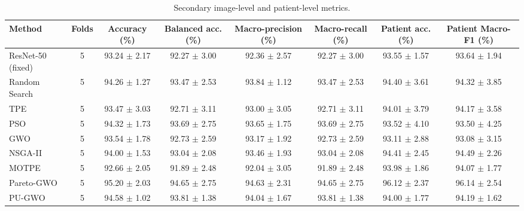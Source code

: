 \begin{table}[t]
\centering
\caption{Secondary image-level and patient-level metrics.}
\label{tab:table4_secondary_metrics}
\small
\begin{tabular}{lccccccc}
\toprule
Method & Folds & Accuracy (\%) & Balanced acc. (\%) & Macro-precision (\%) & Macro-recall (\%) & Patient acc. (\%) & Patient Macro-F1 (\%) \\
\midrule
ResNet-50 (fixed) & 5 & 93.24 $\pm$ 2.17 & 92.27 $\pm$ 3.00 & 92.36 $\pm$ 2.57 & 92.27 $\pm$ 3.00 & 93.55 $\pm$ 1.57 & 93.64 $\pm$ 1.94 \\
Random Search & 5 & 94.26 $\pm$ 1.27 & 93.47 $\pm$ 2.53 & 93.84 $\pm$ 1.12 & 93.47 $\pm$ 2.53 & 94.40 $\pm$ 3.61 & 94.32 $\pm$ 3.85 \\
TPE & 5 & 93.47 $\pm$ 3.03 & 92.71 $\pm$ 3.11 & 93.00 $\pm$ 3.05 & 92.71 $\pm$ 3.11 & 94.01 $\pm$ 3.79 & 94.17 $\pm$ 3.58 \\
PSO & 5 & 94.32 $\pm$ 1.73 & 93.69 $\pm$ 2.75 & 93.65 $\pm$ 1.75 & 93.69 $\pm$ 2.75 & 93.52 $\pm$ 4.10 & 93.50 $\pm$ 4.25 \\
GWO & 5 & 93.54 $\pm$ 1.78 & 92.73 $\pm$ 2.59 & 93.17 $\pm$ 1.92 & 92.73 $\pm$ 2.59 & 93.11 $\pm$ 2.88 & 93.08 $\pm$ 3.15 \\
NSGA-II & 5 & 94.00 $\pm$ 1.53 & 93.04 $\pm$ 2.08 & 93.46 $\pm$ 1.93 & 93.04 $\pm$ 2.08 & 94.41 $\pm$ 2.45 & 94.49 $\pm$ 2.26 \\
MOTPE & 5 & 92.66 $\pm$ 2.05 & 91.89 $\pm$ 2.48 & 92.04 $\pm$ 3.05 & 91.89 $\pm$ 2.48 & 93.98 $\pm$ 1.86 & 94.07 $\pm$ 1.77 \\
Pareto-GWO & 5 & 95.20 $\pm$ 2.03 & 94.65 $\pm$ 2.75 & 94.63 $\pm$ 2.31 & 94.65 $\pm$ 2.75 & 96.12 $\pm$ 2.37 & 96.14 $\pm$ 2.54 \\
PU-GWO & 5 & 94.58 $\pm$ 1.02 & 93.81 $\pm$ 1.38 & 94.04 $\pm$ 1.67 & 93.81 $\pm$ 1.38 & 94.00 $\pm$ 1.77 & 94.19 $\pm$ 1.62 \\
\bottomrule
\end{tabular}
\end{table}
